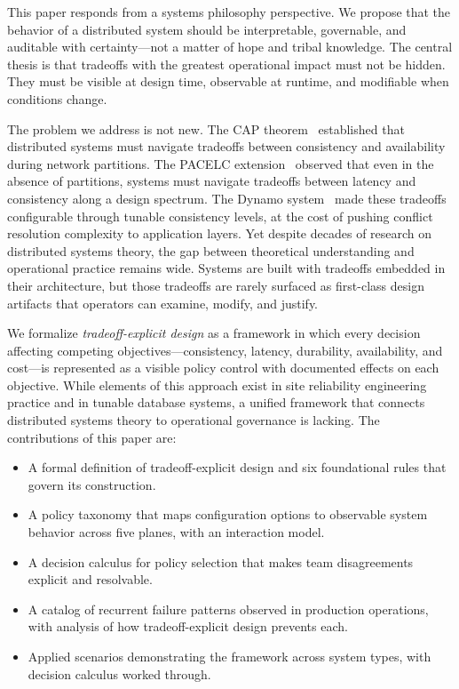 \documentclass[conference]{IEEEtran}
\begin{document}
This paper responds from a systems philosophy perspective. We propose that the behavior of a distributed system should be interpretable, governable, and auditable with certainty---not a matter of hope and tribal knowledge. The central thesis is that tradeoffs with the greatest operational impact must not be hidden. They must be visible at design time, observable at runtime, and modifiable when conditions change.

The problem we address is not new. The CAP theorem~\cite{brewer2000cap,gilbert2002brewer} established that distributed systems must navigate tradeoffs between consistency and availability during network partitions. The PACELC extension~\cite{pacelc} observed that even in the absence of partitions, systems must navigate tradeoffs between latency and consistency along a design spectrum. The Dynamo system~\cite{dynamo} made these tradeoffs configurable through tunable consistency levels, at the cost of pushing conflict resolution complexity to application layers. Yet despite decades of research on distributed systems theory, the gap between theoretical understanding and operational practice remains wide. Systems are built with tradeoffs embedded in their architecture, but those tradeoffs are rarely surfaced as first-class design artifacts that operators can examine, modify, and justify.

We formalize \textit{tradeoff-explicit design} as a framework in which every decision affecting competing objectives---consistency, latency, durability, availability, and cost---is represented as a visible policy control with documented effects on each objective. While elements of this approach exist in site reliability engineering practice and in tunable database systems, a unified framework that connects distributed systems theory to operational governance is lacking. The contributions of this paper are:

\begin{itemize}
    \item A formal definition of tradeoff-explicit design and six foundational rules that govern its construction.
    \item A policy taxonomy that maps configuration options to observable system behavior across five planes, with an interaction model.
    \item A decision calculus for policy selection that makes team disagreements explicit and resolvable.
    \item A catalog of recurrent failure patterns observed in production operations, with analysis of how tradeoff-explicit design prevents each.
    \item Applied scenarios demonstrating the framework across system types, with decision calculus worked through.
\end{itemize}
\end{document}
